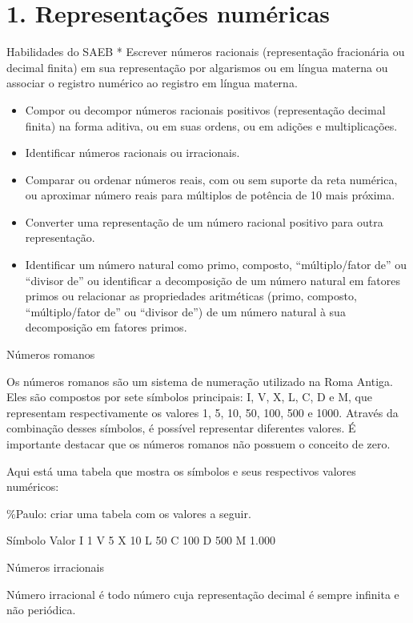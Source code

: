 
\section{1. Representações
numéricas}

Habilidades do SAEB * Escrever números racionais (representação
fracionária ou decimal finita) em sua representação por algarismos ou em
língua materna ou associar o registro numérico ao registro em língua
materna.

\begin{itemize}
\item
  Compor ou decompor números racionais positivos (representação decimal
  finita) na forma aditiva, ou em suas ordens, ou em adições e
  multiplicações.
\item
  Identificar números racionais ou irracionais.
\item
  Comparar ou ordenar números reais, com ou sem suporte da reta
  numérica, ou aproximar número reais para múltiplos de potência de 10
  mais próxima.
\item
  Converter uma representação de um número racional positivo para outra
  representação.
\item
  Identificar um número natural como primo, composto, ``múltiplo/fator
  de'' ou ``divisor de'' ou identificar a decomposição de um número
  natural em fatores primos ou relacionar as propriedades aritméticas
  (primo, composto, ``múltiplo/fator de'' ou ``divisor de'') de um
  número natural à sua decomposição em fatores primos.
\end{itemize}

Números romanos

Os números romanos são um sistema de numeração utilizado na Roma Antiga.
Eles são compostos por sete símbolos principais: I, V, X, L, C, D e M,
que representam respectivamente os valores 1, 5, 10, 50, 100, 500 e
1000. Através da combinação desses símbolos, é possível representar
diferentes valores. É importante destacar que os números romanos não
possuem o conceito de zero.

Aqui está uma tabela que mostra os símbolos e seus respectivos valores
numéricos:

\%Paulo: criar uma tabela com os valores a seguir.

Símbolo Valor I 1 V 5 X 10 L 50 C 100 D 500 M 1.000

Números irracionais

Número irracional é todo número cuja representação decimal é sempre
infinita e não periódica.

